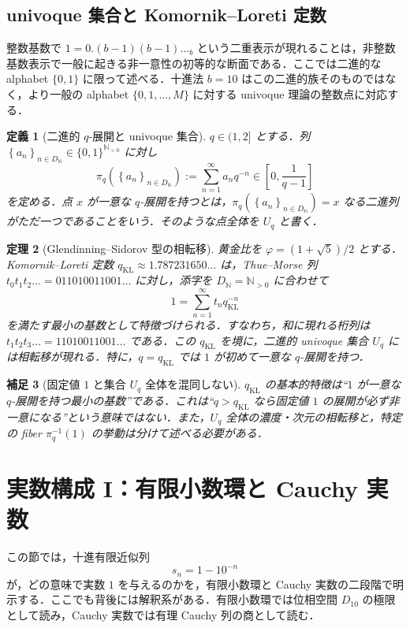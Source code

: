 \documentclass[a4paper,11pt]{ltjsarticle}
\theoremstyle{jpdef}
\newtheorem{definition}{定義}[section]
\newtheorem{remark}[definition]{補足}
\theoremstyle{jpthm}
\newtheorem{theorem}[definition]{定理}
\newcommand{\N}{\mathbb{N}}
\newcommand{\Ns}{\N_{>0}}
\newcommand{\DN}{D_{\N}}
\newcommand{\seq}[2]{\left\{#1\right\}_{#2}}
\newcommand{\KL}{q_{\mathrm{KL}}}
\begin{document}
\subsection{univoque 集合と Komornik--Loreti 定数}

整数基数で \(1=0.(b-1)(b-1)\ldots_b\) という二重表示が現れることは，非整数基数表示で一般に起きる非一意性の初等的な断面である．ここでは二進的な alphabet \(\{0,1\}\) に限って述べる．十進法 \(b=10\) はこの二進的族そのものではなく，より一般の alphabet \(\{0,1,\ldots,M\}\) に対する univoque 理論の整数点に対応する．

\begin{definition}[二進的 \(q\)-展開と univoque 集合]
\(q\in(1,2]\) とする．列 \(\seq{a_n}{n\in\DN}\in\{0,1\}^{\Ns}\) に対し
\[
  \pi_q(\seq{a_n}{n\in\DN})
  :=\sum_{n=1}^{\infty}a_nq^{-n}
  \in\left[0,\frac{1}{q-1}\right]
\]
を定める．点 \(x\) が一意な \(q\)-展開を持つとは，\(\pi_q(\seq{a_n}{n\in\DN})=x\) なる二進列がただ一つであることをいう．そのような点全体を \(U_q\) と書く．
\end{definition}

\begin{theorem}[Glendinning--Sidorov 型の相転移]
黄金比を \(\varphi=(1+\sqrt5)/2\) とする．Komornik--Loreti 定数 \(\KL\approx1.787231650\ldots\) は，Thue--Morse 列 \(t_0t_1t_2\ldots=011010011001\ldots\) に対し，添字を \(\DN=\N_{>0}\) に合わせて
\[
  1=\sum_{n=1}^{\infty}t_n \KL^{-n}
\]
を満たす最小の基数として特徴づけられる．すなわち，和に現れる桁列は \(t_1t_2t_3\ldots=11010011001\ldots\) である．この \(\KL\) を境に，二進的 univoque 集合 \(U_q\) には相転移が現れる．特に，\(q=\KL\) では \(1\) が初めて一意な \(q\)-展開を持つ．
\end{theorem}

\begin{remark}[固定値 \(1\) と集合 \(U_q\) 全体を混同しない]
\(\KL\) の基本的特徴は``\(1\) が一意な \(q\)-展開を持つ最小の基数''である．これは``\(q>\KL\) なら固定値 \(1\) の展開が必ず非一意になる''という意味ではない．また，\(U_q\) 全体の濃度・次元の相転移と，特定の fiber \(\pi_q^{-1}(1)\) の挙動は分けて述べる必要がある．
\end{remark}

\section{実数構成 I：有限小数環と Cauchy 実数}

この節では，十進有限近似列
\[
  s_n=1-10^{-n}
\]
が，どの意味で実数 \(1\) を与えるのかを，有限小数環と Cauchy 実数の二段階で明示する．ここでも背後には解釈系がある．有限小数環では位相空間 \(D_{10}\) の極限として読み，Cauchy 実数では有理 Cauchy 列の商として読む．
\end{document}
